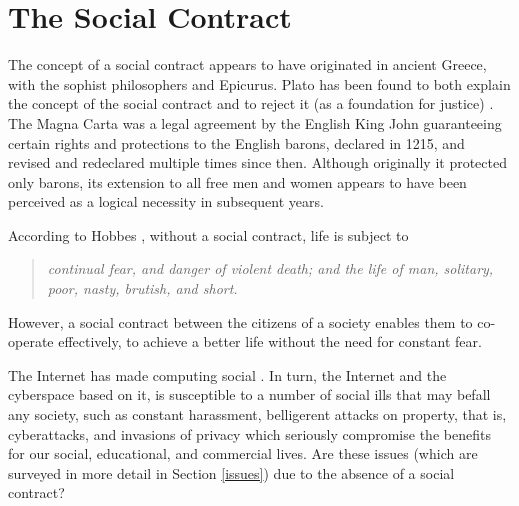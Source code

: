 \section{The Social Contract}

The concept of a social contract appears to have originated in ancient
Greece, with the sophist philosophers and Epicurus. Plato has been
found to both explain the concept of the social contract and to reject
it (as a foundation for justice)  \cite{Plato5} .
The Magna Carta was a legal agreement by the English King John
guaranteeing certain rights and protections to the English barons, 
declared in 1215, and revised and redeclared
multiple times since then. Although originally it protected only barons,
its extension to all free men and women appears to have been perceived
as a logical necessity in subsequent years.

\iffalse
The modern
resurgence of the social contract is associated with the philosophers
Hobbes \cite{Leviathan}, circa 1650, Locke, Voltaire, and Rousseau and also with great
political changes in England, the United States, and France in which
individuals outside the privileged classes, and large communities of
such individuals made major contributions toward the theoretical
and practical implementation of a social contract in England, the United
States, and France \cite{Goodall}.
\fi

According to Hobbes \cite{Leviathan}, without a social contract, life is subject to
\begin{quote}\em
continual fear, and danger of violent death; and the life of man, solitary, poor, nasty, brutish, and short.
\end{quote}
However, a social contract between the citizens of a society enables them to co-operate
effectively, to achieve a better life without the need for constant fear.

The Internet has made computing social \cite{parameswaran2007social}. In
turn, the Internet and the cyberspace based on it, is susceptible to
a number of social ills that may befall any society, such as constant
harassment, belligerent attacks on property, that is, cyberattacks,
and invasions of privacy which seriously compromise the benefits for our
social, educational, and commercial lives. Are these issues (which are
surveyed in more detail in Section \ref{issues}) due to the absence
of a social contract?

